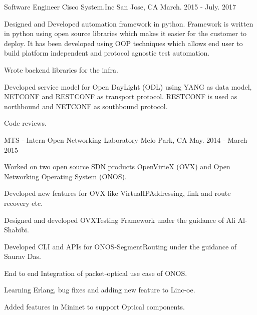 \begin{cventries}
  \cventry
    {Software Engineer} %
    {Cisco System.Inc} %
    {San Jose, CA} %
    {March. 2015 - July. 2017} %
    {
      \begin{cvitems} %
        \item {Designed and Developed automation framework in python.
                Framework is written in python using open source libraries which makes it easier for the customer to deploy.
                It has been developed using OOP techniques which allows end user to build platform independent and protocol agnostic test automation.}
        \item {Wrote backend libraries for the infra.}
        \item {Developed service model for Open DayLight (ODL) using YANG as data model, NETCONF and RESTCONF as transport protocol.
        		RESTCONF is used as northbound and NETCONF as southbound protocol.}
        \item {Code reviews.}
      \end{cvitems}
    }

  \cventry
    {MTS - Intern} %
    {Open Networking Laboratory} %
    {Melo Park, CA} %
    {May. 2014 - March 2015} %
    {
      \begin{cvitems} %
        \item {Worked on two open source SDN products OpenVirteX (OVX) and Open Networking Operating System (ONOS).}
        \item {Developed new features for OVX like VirtualIPAddressing, link and route recovery etc.}
        \item {Designed and developed OVXTesting Framework under the guidance of Ali Al-Shabibi.}
        \item {Developed CLI and APIs for ONOS-SegmentRouting under the guidance of Saurav Das.}
        \item {End to end Integration of packet-optical use case of ONOS.}
        \item {Learning Erlang, bug fixes and adding new feature to Linc-oe.}
        \item {Added features in Mininet to support Optical components.}
      \end{cvitems}
    }

\end{cventries}
